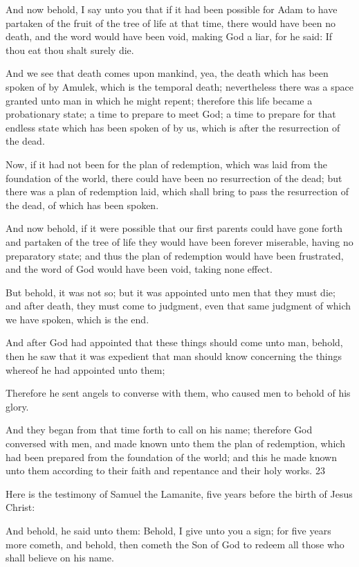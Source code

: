 And now behold, I say unto you that if it had been possible for Adam to have partaken of the
fruit of the tree of life at that time, there would have been no death, and the word would have
been void, making God a liar, for he said: If thou eat thou shalt surely die.

And we see that death comes upon mankind, yea, the death which has been spoken of by
Amulek, which is the temporal death; nevertheless there was a space granted unto man in
which he might repent; therefore this life became a probationary state; a time to prepare to
meet God; a time to prepare for that endless state which has been spoken of by us, which is
after the resurrection of the dead.

Now, if it had not been for the plan of redemption, which was laid from the foundation of the
world, there could have been no resurrection of the dead; but there was a plan of redemption
laid, which shall bring to pass the resurrection of the dead, of which has been spoken.

And now behold, if it were possible that our first parents could have gone forth and partaken
of the tree of life they would have been forever miserable, having no preparatory state; and
thus the plan of redemption would have been frustrated, and the word of God would have
been void, taking none effect.

But behold, it was not so; but it was appointed unto men that they must die; and after death,
they must come to judgment, even that same judgment of which we have spoken, which is
the end.

And after God had appointed that these things should come unto man, behold, then he saw
that it was expedient that man should know concerning the things whereof he had appointed
unto them;

Therefore he sent angels to converse with them, who caused men to behold of his glory.

And they began from that time forth to call on his name; therefore God conversed with men,
and made known unto them the plan of redemption, which had been prepared from the
foundation of the world; and this he made known unto them according to their faith and
repentance and their holy works. 23

Here is the testimony of Samuel the Lamanite, five years before the birth of Jesus Christ:

And behold, he said unto them: Behold, I give unto you a sign; for five years more cometh,
and behold, then cometh the Son of God to redeem all those who shall believe on his name.

